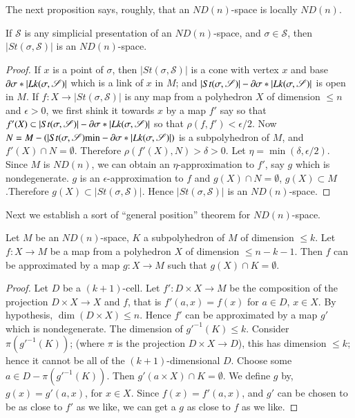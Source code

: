 The next proposition says, roughly, that an $ND(n)$-space is locally $ND(n)$.

\begin{proposition}\label{chap5-prop5.2.4}
If $\mathscr{S}$ is any simplicial presentation of an $ND(n)$-space, and $\sigma\in \mathscr{S}$, then $|St(\sigma,\mathscr{S})|$ is an $ND(n)$-space. 
\end{proposition}

\begin{proof}
If $x$ is a point of $\sigma$, then $|St(\sigma,\mathscr{S})|$ is a cone with vertex $x$ and base $\partial \sigma\ast|Lk(\sigma,\mathscr{S})|$ which is a link of $x$ in $M$; and $|St(\sigma,\mathscr{S})|-\partial \sigma\ast|Lk(\sigma,\mathscr{S})|$ is open in $M$. If $f:X\to |St(\sigma,\mathscr{S})|$ is any map from a polyhedron $X$ of dimension $\leq n$ and $\epsilon >0$, we first shink it towards $x$ by a map $f'$ say so that $f'(X)\subset |St(\sigma,\mathscr{S})|-\partial \sigma \ast|Lk(\sigma,\mathscr{S})|$ so that $\rho(f,f')<\epsilon/2$. Now $N=M-(|St(\sigma,\mathscr{S})\text{min}-\partial \sigma\ast|Lk(\sigma,\mathscr{S})|)$ is a subpolyhedron of $M$, and $f'(X)\cap N=\emptyset$. Therefore $\rho(f'(X),N)>\delta>0$. Let $\eta=\min(\delta,\epsilon/2)$. Since $M$ is $ND(n)$, we can obtain an $\eta$-approximation to $f'$, say $g$ which is nondegenerate. $g$ is an $\epsilon$-approximation to $f$ and $g(X)\cap N=\emptyset$, $g(X)\subset M$.\pageoriginale Therefore $g(X)\subset \mid St(\sigma,\mathscr{S})|$. Hence $|St(\sigma,\mathscr{S})|$ is an $ND(n)$-space.
\end{proof}

Next we establish a sort of ``general position'' theorem for $ND(n)$-space.

\begin{theorem}\label{chap5-thm5.2.5}
Let $M$ be an $ND(n)$-space, $K$ a subpolyhedron of $M$ of dimension $\leq k$. Let $f:X\to M$ be a map from a polyhedron $X$ of dimension $\leq n-k-1$. Then $f$ can be approximated by a map $g:X\to M$ such that $g(X)\cap K=\emptyset$.
\end{theorem}

\begin{proof}
Let $D$ be a $(k+1)$-cell. Let $f':D\times X\to M$ be the composition of the projection $D\times X\to X$ and $f$, that is $f'(a,x)=f(x)$ for $a\in D$, $x\in X$. By hypothesis, $\dim (D\times X)\leq n$.  Hence $f'$ can be approximated by a map $g'$ which is nondegenerate. The dimension of ${g'}^{-1}(K)\leq k$. Consider $\pi({g'}^{-1}(K))$; (where $\pi$ is the projection $D\times X\to D$), this has dimension $\leq k$; hence it cannot be all of the $(k+1)$-dimensional $D$. Choose some $a \in D-\pi({g'}^{-1}(K))$. Then $g'(a\times X)\cap K=\emptyset$. We define $g$ by, $g(x)=g'(a,x)$, for $x\in X$. Since $f(x)=f'(a,x)$, and $g'$ can be chosen to be as close to $f'$ as we like, we can get a $g$ as close to $f$ as we like. 
\end{proof}

